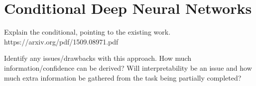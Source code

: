 \section{Conditional Deep Neural Networks}
\label{sec:conditional}
Explain the conditional, pointing to the existing work. https://arxiv.org/pdf/1509.08971.pdf

Identify any issues/drawbacks with this approach. How much information/confidence can be derived?
Will interpretability be an issue and how much extra information be gathered from the task being
partially completed?
